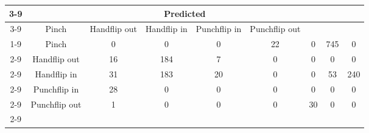 \documentclass{standalone}
\begin{document}
 
 \begin{tabular}{|c |c |c |c |c |c |c |c |c |}
\cline{3-9}\multicolumn{2}{c|}{} & \multicolumn{7}{c|}{Predicted} \\ 
\cline{3-9} \multicolumn{2}{c |}{ } & Pinch & Handflip out & Handflip in & Punchflip in & Punchflip out\\ 
\cline{1-9}\multirow{7}{*}{\rotatebox[origin=c]{90}{Actual}} & Pinch & 0 & 0 & 0 & 22 & 0 & 745 & 0\\ 
 \cline{2-9} & Handflip out & 16 & 184 & 7 & 0 & 0 & 0 & 0\\ 
 \cline{2-9} & Handflip in & 31 & 183 & 20 & 0 & 0 & 53 & 240\\ 
 \cline{2-9} & Punchflip in & 28 & 0 & 0 & 0 & 0 & 0 & 0\\ 
 \cline{2-9} & Punchflip out & 1 & 0 & 0 & 0 & 30 & 0 & 0\\ 
 \cline{2-9}\hline \end{tabular}
 
\end{document}
